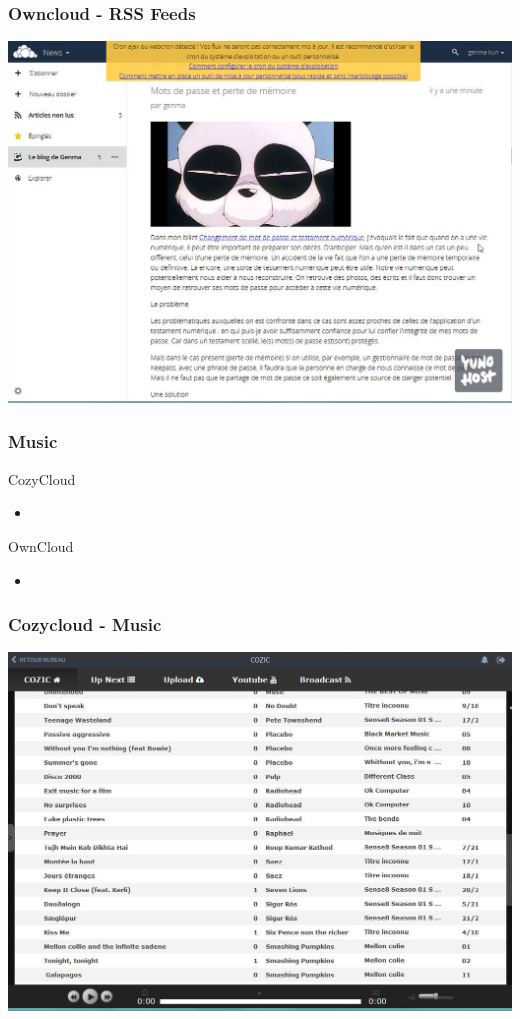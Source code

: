 \documentclass{beamer}
\begin{document}
\begin{frame}
\frametitle{Owncloud - RSS Feeds}
\includegraphics[scale=0.3] {./Owncloud/Owncloud_News.jpg}
\end{frame}
\begin{frame}
\frametitle{Music}

\begin{block}{CozyCloud}
\begin{itemize}
\item 
\end{itemize}
\end{block}

\begin{block}{OwnCloud}
\begin{itemize}
\item 
\end{itemize}
\end{block}
\end{frame}


\begin{frame}
\frametitle{Cozycloud - Music}
\includegraphics[scale=0.3] {./CozyCloud/CozyCloud_Cozic.jpg}
\end{frame}
\end{document}

